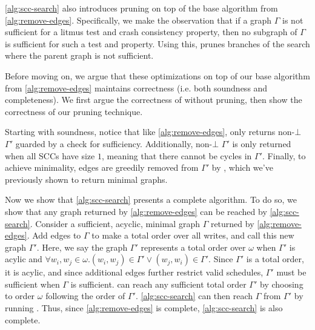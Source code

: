 \autoref{alg:scc-search} also introduces pruning on top of the base algorithm from \autoref{alg:remove-edges}.
Specifically, we make the observation that if a graph $\Gamma$ is not sufficient for a litmus test
and crash consistency property, then no subgraph of $\Gamma$ is sufficient for such a test and property.
Using this, \sccsearch prunes branches of the search where the parent graph is not sufficient.

Before moving on, we argue that these optimizations on top of our base algorithm from \autoref{alg:remove-edges}
maintains correctness (i.e. both soundness and completeness). We first argue the correctness of \sccsearch
without pruning, then show the correctness of our pruning technique.

Starting with soundness, notice that like \autoref{alg:remove-edges},
 only returns non-$\bot$ $\Gamma'$ guarded by a check for sufficiency.
Additionally, non-$\bot$ $\Gamma'$ is only returned when all SCCs have size $1$, meaning that there cannot be
cycles in $\Gamma'$. Finally, to achieve minimality, edges are greedily removed from $\Gamma'$ by
, which we've previously shown to return minimal graphs.

Now we show that \autoref{alg:scc-search} presents a complete algorithm. To do so, we show that any graph
returned by \autoref{alg:remove-edges} can be reached by \autoref{alg:scc-search}. Consider a sufficient, acyclic,
minimal graph $\Gamma$ returned by \autoref{alg:remove-edges}. Add edges to $\Gamma$ to make a total order over all
writes, and call this new graph $\Gamma'$. Here, we say the graph $\Gamma'$ represents a total order over $\omega$
when $\Gamma'$ is acylic and $\forall w_i,w_j\in\omega. (w_i,w_j)\in\Gamma' \vee (w_j,w_i)\in\Gamma'$.
Since $\Gamma'$ is a total order, it is acylic, and since additional edges further restrict valid schedules,
$\Gamma'$ must be sufficient when $\Gamma$ is sufficient.  can reach any sufficient
total order $\Gamma'$ by choosing to order $\omega$ following the order of $\Gamma'$. \autoref{alg:scc-search}
can then reach $\Gamma$ from $\Gamma'$ by running . Thus, since \autoref{alg:remove-edges}
is complete, \autoref{alg:scc-search} is also complete.


